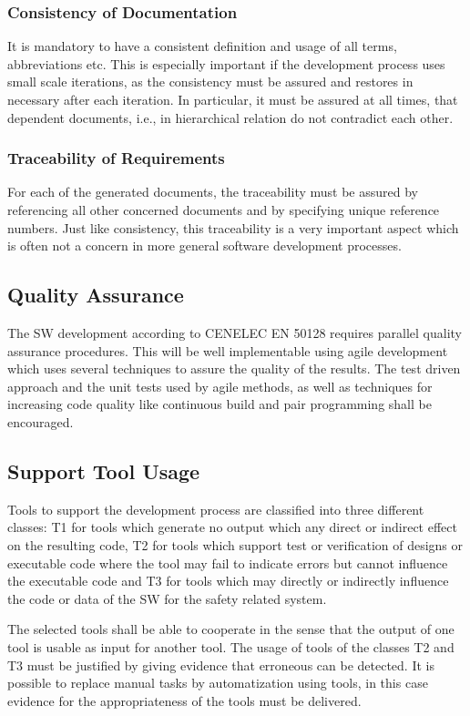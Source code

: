 \subsubsection{Consistency of Documentation}
\label{sec:cons-docum}

It is mandatory to have a consistent definition and usage of all terms,
abbreviations etc. This is especially important if the development process uses
small scale iterations, as the consistency must be assured and restores in
necessary after each iteration. In particular, it must be assured at all times,
that dependent documents, i.e., in hierarchical relation do not contradict each
other.

\subsubsection{Traceability of Requirements}
\label{sec:trac-requ}

For each of the generated documents, the traceability must be assured by
referencing all other concerned documents and by specifying unique reference
numbers. Just like consistency, this traceability is a very important aspect
which is often not a concern in more general software development processes.


\subsection{Quality Assurance}
\label{sec:quality-assurance}

The SW development according to CENELEC EN 50128 requires parallel quality
assurance procedures. This will be well implementable using agile development
which uses several techniques to assure the quality of the results. The test
driven approach and the unit tests used by agile methods, as well as techniques
for increasing code quality like continuous build and pair programming shall be
encouraged.

\subsection{Support Tool Usage}
\label{sec:tool-usage}

Tools to support the development process are classified into three different
classes: T1 for tools which generate no output which any direct or indirect
effect on the resulting code, T2 for tools which support test or verification of
designs or executable code where the tool may fail to indicate errors but cannot
influence the executable code and T3 for tools which may directly or indirectly
influence the code or data of the SW for the safety related system.

The selected tools shall be able to cooperate in the sense that the output of
one tool is usable as input for another tool. The usage of tools of the classes
T2 and T3 must be justified by giving evidence that erroneous can be
detected. It is possible to replace manual tasks by automatization using tools,
in this case evidence for the appropriateness of the tools must be delivered.


